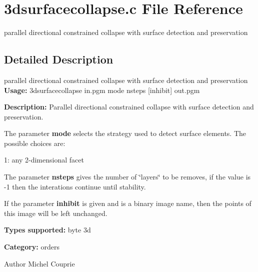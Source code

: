\section{3dsurfacecollapse.c File Reference}
\label{3dsurfacecollapse_8c}


parallel directional constrained collapse with surface detection and preservation  




\subsection{Detailed Description}
parallel directional constrained collapse with surface detection and preservation {\bfseries Usage:} 3dsurfacecollapse in.pgm mode nsteps [inhibit] out.pgm

{\bfseries Description:} Parallel directional constrained collapse with surface detection and preservation.

The parameter {\bfseries mode} selects the strategy used to detect surface elements. The possible choices are: \begin{DoxyItemize}
\item 1: any 2-\/dimensional facet\end{DoxyItemize}
The parameter {\bfseries nsteps} gives the number of \char`\"{}layers\char`\"{} to be removes, if the value is -\/1 then the interations continue until stability.

If the parameter {\bfseries inhibit} is given and is a binary image name, then the points of this image will be left unchanged.

{\bfseries Types supported:} byte 3d

{\bfseries Category:} orders

\begin{DoxyAuthor}{Author}
Michel Couprie 
\end{DoxyAuthor}
